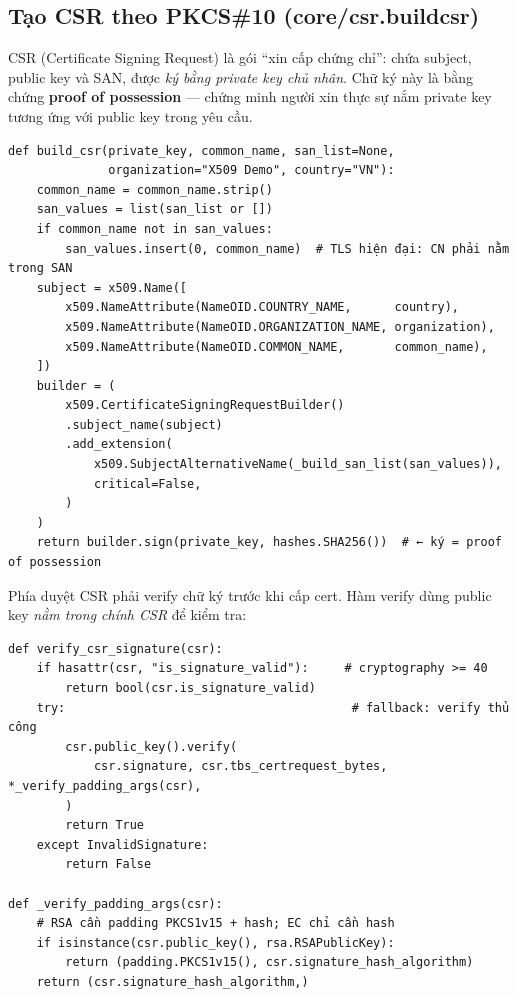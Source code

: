 \documentclass[12pt,a4paper]{article}
\newcommand{\code}[1]{{\ttfamily\small\def\_{\textunderscore\discretionary{}{}{}}#1}}
\begin{document}
\subsection{Tạo CSR theo PKCS\#10 (\code{core/csr.build\_csr})}

CSR (Certificate Signing Request) là gói \enquote{xin cấp chứng chỉ}: chứa
subject, public key và SAN, được \emph{ký bằng private key chủ nhân}. Chữ ký này
là bằng chứng \textbf{proof of possession} — chứng minh người xin thực sự nắm
private key tương ứng với public key trong yêu cầu.

\begin{Verbatim}
def build_csr(private_key, common_name, san_list=None,
              organization="X509 Demo", country="VN"):
    common_name = common_name.strip()
    san_values = list(san_list or [])
    if common_name not in san_values:
        san_values.insert(0, common_name)  # TLS hiện đại: CN phải nằm trong SAN
    subject = x509.Name([
        x509.NameAttribute(NameOID.COUNTRY_NAME,      country),
        x509.NameAttribute(NameOID.ORGANIZATION_NAME, organization),
        x509.NameAttribute(NameOID.COMMON_NAME,       common_name),
    ])
    builder = (
        x509.CertificateSigningRequestBuilder()
        .subject_name(subject)
        .add_extension(
            x509.SubjectAlternativeName(_build_san_list(san_values)),
            critical=False,
        )
    )
    return builder.sign(private_key, hashes.SHA256())  # ← ký = proof of possession
\end{Verbatim}

Phía duyệt CSR phải verify chữ ký trước khi cấp cert. Hàm verify dùng public key
\emph{nằm trong chính CSR} để kiểm tra:

\begin{Verbatim}
def verify_csr_signature(csr):
    if hasattr(csr, "is_signature_valid"):     # cryptography >= 40
        return bool(csr.is_signature_valid)
    try:                                        # fallback: verify thủ công
        csr.public_key().verify(
            csr.signature, csr.tbs_certrequest_bytes, *_verify_padding_args(csr),
        )
        return True
    except InvalidSignature:
        return False

def _verify_padding_args(csr):
    # RSA cần padding PKCS1v15 + hash; EC chỉ cần hash
    if isinstance(csr.public_key(), rsa.RSAPublicKey):
        return (padding.PKCS1v15(), csr.signature_hash_algorithm)
    return (csr.signature_hash_algorithm,)
\end{Verbatim}
\end{document}
